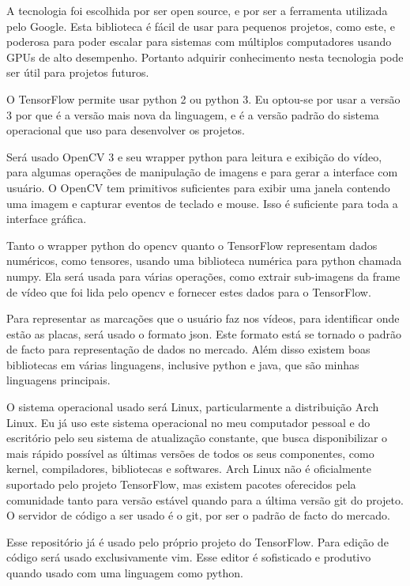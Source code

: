 A tecnologia foi escolhida por ser open source, e por ser a ferramenta
utilizada pelo Google. Esta biblioteca é fácil de usar para pequenos projetos,
como este, e poderosa para poder escalar para sistemas com múltiplos
computadores usando GPUs de alto desempenho. Portanto adquirir conhecimento
nesta tecnologia pode ser útil para projetos futuros.

O TensorFlow permite usar python 2 ou python 3. Eu optou-se por usar a versão 3
por que é a versão mais nova da linguagem, e é a versão padrão do sistema
operacional que uso para desenvolver os projetos.

Será usado OpenCV 3 e seu wrapper python para leitura e exibição do vídeo, para
algumas operações de manipulação de imagens e para gerar a interface com
usuário. O OpenCV tem primitivos suficientes para exibir uma janela contendo
uma imagem e capturar eventos de teclado e mouse. Isso é suficiente para toda a
interface gráfica.

Tanto o wrapper python do opencv quanto o TensorFlow representam dados
numéricos, como tensores, usando uma biblioteca numérica para python chamada
numpy. Ela será usada para várias operações, como extrair sub-imagens da frame
de vídeo que foi lida pelo opencv e fornecer estes dados para o TensorFlow.

Para representar as marcações que o usuário faz nos vídeos, para identificar
onde estão as placas, será usado o formato json. Este formato está se tornado o
padrão de facto para representação de dados no mercado. Além disso existem boas
bibliotecas em várias linguagens, inclusive python e java, que são minhas
linguagens principais.

O sistema operacional usado será Linux, particularmente a distribuição Arch
Linux. Eu já uso este sistema operacional no meu computador pessoal e do
escritório pelo seu sistema de atualização constante, que busca disponibilizar
o mais rápido possível as últimas versões de todos os seus componentes, como
kernel, compiladores, bibliotecas e softwares.
Arch Linux não é oficialmente suportado pelo projeto TensorFlow, mas existem
pacotes oferecidos pela comunidade tanto para versão estável quando para a
última versão git do projeto.
O servidor de código a ser usado é o git, por ser o padrão de facto do mercado.

Esse repositório já é usado pelo próprio projeto do TensorFlow.
Para edição de código será usado exclusivamente vim. Esse editor é sofisticado
e produtivo quando usado com uma linguagem como python.



